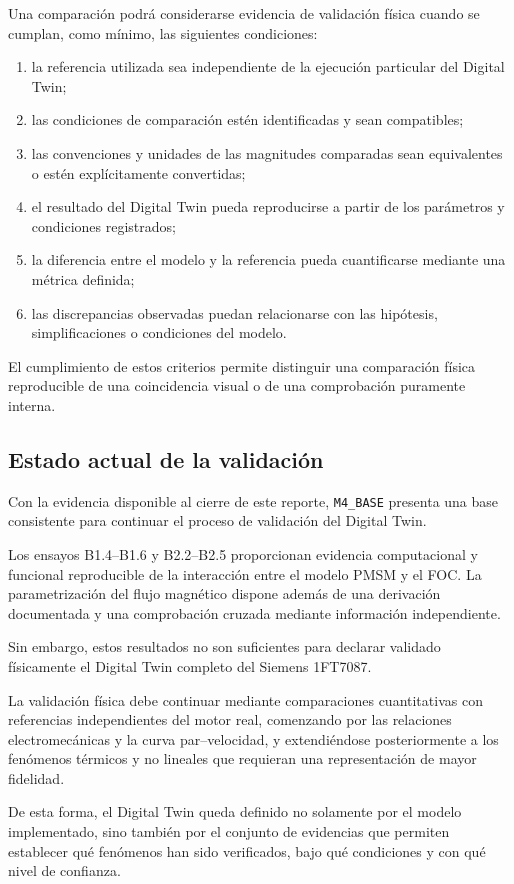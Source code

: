 Una comparación podrá considerarse evidencia de validación física cuando se cumplan, como mínimo, las siguientes condiciones:

\begin{enumerate}

\item la referencia utilizada sea independiente de la ejecución particular del Digital Twin;

\item las condiciones de comparación estén identificadas y sean compatibles;

\item las convenciones y unidades de las magnitudes comparadas sean equivalentes o estén explícitamente convertidas;

\item el resultado del Digital Twin pueda reproducirse a partir de los parámetros y condiciones registrados;

\item la diferencia entre el modelo y la referencia pueda cuantificarse mediante una métrica definida;

\item las discrepancias observadas puedan relacionarse con las hipótesis, simplificaciones o condiciones del modelo.

\end{enumerate}

El cumplimiento de estos criterios permite distinguir una comparación física reproducible de una coincidencia visual o de una comprobación puramente interna.

\subsection{Estado actual de la validación}

Con la evidencia disponible al cierre de este reporte, \texttt{M4\_BASE} presenta una base consistente para continuar el proceso de validación del Digital Twin.

Los ensayos B1.4--B1.6 y B2.2--B2.5 proporcionan evidencia computacional y funcional reproducible de la interacción entre el modelo PMSM y el FOC. La parametrización del flujo magnético dispone además de una derivación documentada y una comprobación cruzada mediante información independiente.

Sin embargo, estos resultados no son suficientes para declarar validado físicamente el Digital Twin completo del Siemens 1FT7087.

La validación física debe continuar mediante comparaciones cuantitativas con referencias independientes del motor real, comenzando por las relaciones electromecánicas y la curva par--velocidad, y extendiéndose posteriormente a los fenómenos térmicos y no lineales que requieran una representación de mayor fidelidad.

De esta forma, el Digital Twin queda definido no solamente por el modelo implementado, sino también por el conjunto de evidencias que permiten establecer qué fenómenos han sido verificados, bajo qué condiciones y con qué nivel de confianza.
